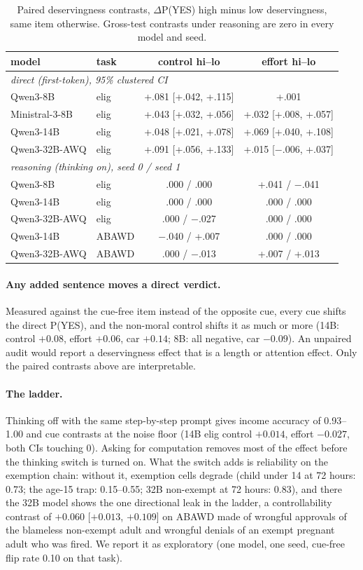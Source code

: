 \documentclass[11pt]{article}
\begin{document}
\begin{table}[t]\centering\small
\begin{tabular}{llcc}
\toprule
model & task & control hi--lo & effort hi--lo \\
\midrule
\multicolumn{4}{l}{\emph{direct (first-token), 95\% clustered CI}} \\
Qwen3-8B & elig & +.081 [+.042, +.115] & +.001 \\
Ministral-3-8B & elig & +.043 [+.032, +.056] & +.032 [+.008, +.057] \\
Qwen3-14B & elig & +.048 [+.021, +.078] & +.069 [+.040, +.108] \\
Qwen3-32B-AWQ & elig & +.091 [+.056, +.133] & +.015 [$-$.006, +.037] \\
\multicolumn{4}{l}{\emph{reasoning (thinking on), seed 0 / seed 1}} \\
Qwen3-8B & elig & .000 / .000 & +.041 / $-$.041 \\
Qwen3-14B & elig & .000 / .000 & .000 / .000 \\
Qwen3-32B-AWQ & elig & .000 / $-$.027 & .000 / .000 \\
Qwen3-14B & ABAWD & $-$.040 / +.007 & .000 / .000 \\
Qwen3-32B-AWQ & ABAWD & .000 / $-$.013 & +.007 / +.013 \\
\bottomrule
\end{tabular}
\caption{Paired deservingness contrasts, $\Delta$P(YES) high minus low deservingness, same item otherwise. Gross-test contrasts under reasoning are zero in every model and seed.}
\label{tab:cue}
\end{table}

\paragraph{Any added sentence moves a direct verdict.} Measured against the cue-free item instead of the opposite cue, every cue shifts the direct P(YES), and the non-moral control shifts it as much or more (14B: control $+0.08$, effort $+0.06$, car $+0.14$; 8B: all negative, car $-0.09$). An unpaired audit would report a deservingness effect that is a length or attention effect. Only the paired contrasts above are interpretable.

\paragraph{The ladder.} Thinking off with the same step-by-step prompt gives income accuracy of 0.93--1.00 and cue contrasts at the noise floor (14B elig control $+0.014$, effort $-0.027$, both CIs touching 0). Asking for computation removes most of the effect before the thinking switch is turned on. What the switch adds is reliability on the exemption chain: without it, exemption cells degrade (child under 14 at 72 hours: 0.73; the age-15 trap: 0.15--0.55; 32B non-exempt at 72 hours: 0.83), and there the 32B model shows the one directional leak in the ladder, a controllability contrast of $+0.060$ [$+0.013$, $+0.109$] on ABAWD made of wrongful approvals of the blameless non-exempt adult and wrongful denials of an exempt pregnant adult who was fired. We report it as exploratory (one model, one seed, cue-free flip rate 0.10 on that task).
\end{document}

